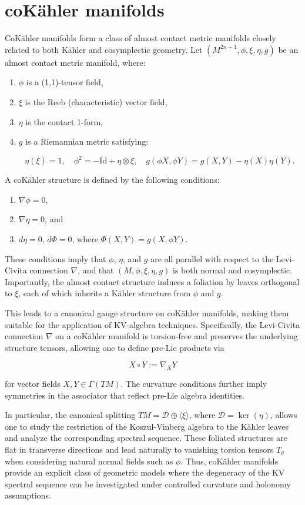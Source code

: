 \section{coK\"{a}hler manifolds}
CoK\"{a}hler manifolds form a class of almost contact metric manifolds closely related to both K\"{a}hler and cosymplectic geometry. Let $(M^{2n+1}, \phi, \xi, \eta, g)$ be an almost contact metric manifold, where:
\begin{enumerate}
\item $\phi$ is a (1,1)-tensor field,
\item $\xi$ is the Reeb (characteristic) vector field,
\item $\eta$ is the contact 1-form,
\item $g$ is a Riemannian metric satisfying:

  $$
  \eta(\xi) = 1,\quad \phi^2 = -\mathrm{Id} + \eta \otimes \xi,\quad g(\phi X, \phi Y) = g(X, Y) - \eta(X)\eta(Y).
  $$
\end{enumerate}
A coK\"{a}hler structure is defined by the following conditions:
\begin{enumerate}
\item $\nabla \phi = 0$,
\item $\nabla \eta = 0$, and
\item $d\eta = 0$, $d\Phi = 0$, where $\Phi(X,Y) = g(X, \phi Y)$.
\end{enumerate}
These conditions imply that $\phi$, $\eta$, and $g$ are all parallel with respect to the Levi-Civita connection $\nabla$, and that $(M, \phi, \xi, \eta, g)$ is both normal and cosymplectic. Importantly, the almost contact structure induces a foliation by leaves orthogonal to $\xi$, each of which inherits a K\"{a}hler structure from $\phi$ and $g$.

This leads to a canonical gauge structure on coK\"{a}hler manifolds, making them suitable for the application of KV-algebra techniques. Specifically, the Levi-Civita connection $\nabla$ on a coK\"{a}hler manifold is torsion-free and preserves the underlying structure tensors, allowing one to define pre-Lie products via

$$
X \circ Y := \nabla_X Y
$$

for vector fields $X, Y \in \Gamma(TM)$. The curvature conditions further imply symmetries in the associator that reflect pre-Lie algebra identities.

In particular, the canonical splitting $TM = \mathcal{D} \oplus \langle \xi \rangle$, where $\mathcal{D} = \ker(\eta)$, allows one to study the restriction of the Koszul-Vinberg algebra to the K\"{a}hler leaves and analyze the corresponding spectral sequence. These foliated structures are flat in transverse directions and lead naturally to vanishing torsion tensors $T_\theta$ when considering natural normal fields such as $\phi$. Thus, coK\"{a}hler manifolds provide an explicit class of geometric models where the degeneracy of the KV spectral sequence can be investigated under controlled curvature and holonomy assumptions.

